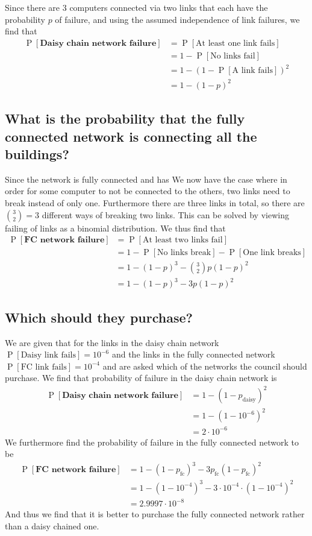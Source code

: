 \documentclass{article}
\DeclareMathOperator{\prob}{P}
\newcommand{\sqrbrac}[1]{\left[#1\right]}
\newcommand{\paren}[1]{\left(#1\right)}
\begin{document}
Since there are 3 computers connected via two links that each have the probability $p$ of failure, and using the assumed independence of link failures, we find that
\begin{align}
    \prob\sqrbrac{\textbf{Daisy chain network failure}}
    &=\prob\sqrbrac{\text{At least one link fails}} \\
    &= 1 - \prob \sqrbrac{\text{No links fail}} \\
    &= 1 - \paren{1 - \prob\sqrbrac{\text{A link fails}}}^2 \\
    &= 1 - (1 - p)^2
\end{align}

\subsection{What is the probability that the fully connected network is connecting all the buildings?}
Since the network is fully connected and has We now have the case where in order for some computer to not be connected to the others, two links need to break instead of only one. Furthermore there are three links in total, so there are $\binom{3}{2}=3$ different ways of breaking two links. This can be solved by viewing failing of links as a binomial distribution. We thus find that
\begin{align}
    \prob\sqrbrac{\textbf{FC network failure}}
    &=\prob\sqrbrac{\text{At least two links fail}} \\
    &= 1 - \prob\sqrbrac{\text{No links break}} - \prob\sqrbrac{\text{One link breaks}} \\
    &= 1 - (1 - p)^3 - \binom{3}{2}p(1 - p)^2 \\
    &= 1 - (1 - p)^3 - 3p(1 - p)^2
\end{align}

\subsection{Which should they purchase?}
We are given that for the links in the daisy chain network $\prob\sqrbrac{\text{Daisy link fails}}=10^{-6}$ and the links in the fully connected network $\prob\sqrbrac{\text{FC link fails}}=10^{-4}$ and are asked which of the networks the council should purchase. We find that probability of failure in the daisy chain network is
\begin{align}
    \prob\sqrbrac{\textbf{Daisy chain network failure}}
    &=1 - (1 - p_\text{daisy})^2 \\
    &=1 - (1 - 10^{-6})^2 \\
    &=2\cdot10^{-6}
\end{align}
We furthermore find the probability of failure in the fully connected network to be
\begin{align}
    \prob\sqrbrac{\textbf{FC network failure}}
    &= 1 - (1 - p_{\text{fc}})^3 - 3p_{\text{fc}}(1 - p_{\text{fc}})^2 \\
    &= 1 - (1 - 10^{-4})^3 - 3\cdot 10^{-4} \cdot (1 - 10^{-4})^2 \\
    &=2.9997\cdot10^{-8}
\end{align}
And thus we find that it is better to purchase the fully connected network rather than a daisy chained one.
\end{document}
